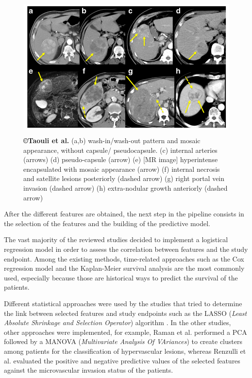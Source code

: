 \documentclass[]{article}
\begin{document}
\begin{figure}[ht!]
\centering
\includegraphics[width=4.67498in,height=2.86979in]{./images/image8.png}
\caption{\textbf{©Taouli et al.} \cite{Taouli2017}
(a,b) wash-in/wash-out pattern and mosaic appearance, without capsule/
pseudocapsule.
(c) internal arteries (arrows)
(d) pseudo-capsule (arrow)
(e) {[}MR image{]} hyperintense encapsulated with mosaic appearance
(arrow)
(f) internal necrosis and satellite lesions posteriorly (dashed arrow)
(g) right portal vein invasion (dashed arrow)
(h) extra-nodular growth anteriorly (dashed arrow)
}
\label{Taouli_imagingTraits}
\end{figure}


After the different features are obtained, the next step in the pipeline
consists in the selection of the features and the building of the
predictive model.

The vast majority of the reviewed studies decided to implement a
logistical regression model in order to assess the correlation between
features and the study endpoint. Among the existing methods,
time-related approaches such as the Cox regression model \cite{Li2016,Banerjee2015,Zheng2018,Cozzi2017,Xia2018} and the Kaplan-Meier survival analysis
\cite{Segal2007,Chen2017,Akai2018,Xia2018} are the most commonly used,
especially because those are historical ways to predict the survival of
the patients.

Different statistical approaches were used by the studies that tried to
determine the link between selected features and study endpoints such as
the LASSO (\emph{Least Absolute Shrinkage and Selection Operator})
algorithm \cite{Zhou2017a,Peng2018,Bakr2017}. In the other studies, other
approaches were implemented, for example, Raman et al.
performed a PCA followed by a
MANOVA (\emph{Multivariate Analysis Of VAriances}) to create clusters
among patients for the classification of hypervascular lesions, whereas
Renzulli et al. evaluated the positive and negative predictive
values of the selected features against the microvascular invasion
status of the patients.
\end{document}
